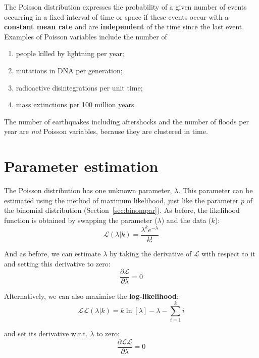 The Poisson distribution expresses the probability of a given number
of events occurring in a fixed interval of time or space if these
events occur with a \textbf{constant mean rate} and are
\textbf{independent} of the time since the last event. Examples of
Poisson variables include the number of

\begin{enumerate}
\item people killed by lightning per year;
\item mutations in DNA per generation;
\item radioactive disintegrations per unit time;
\item mass extinctions per 100 million years.
\end{enumerate}

The number of earthquakes including aftershocks and the number of
floods per year are \emph{not} Poisson variables, because they are
clustered in time.

\section{Parameter estimation}
\label{sec:poispar}

The Poisson distribution has one unknown parameter, $\lambda$. This
parameter can be estimated using the method of maximum likelihood,
just like the parameter $p$ of the binomial distribution
(Section~\ref{sec:binompar}). As before, the likelihood function is
obtained by swapping the parameter ($\lambda$) and the data ($k$):
\begin{equation}
  \mathcal{L}(\lambda|k) = \frac{\lambda^k e^{-\lambda}}{k!}
  \label{eq:poislik}
\end{equation}

And as before, we can estimate $\lambda$ by taking the derivative of
$\mathcal{L}$ with respect to it and setting this derivative to zero:
\begin{equation}
  \frac{\partial{\mathcal{L}}}{\partial{\lambda}} = 0
\end{equation}

Alternatively, we can also maximise the \textbf{log-likelihood}:
\begin{equation}
  \mathcal{LL}(\lambda|k) = k \ln[\lambda] - \lambda - \sum\limits_{i=1}^{k}i
  \label{eq:poisLL}
\end{equation}

\noindent and set its derivative w.r.t. $\lambda$ to zero:
\begin{equation}
  \frac{\partial{\mathcal{LL}}}{\partial{\lambda}} = 0
\end{equation}

